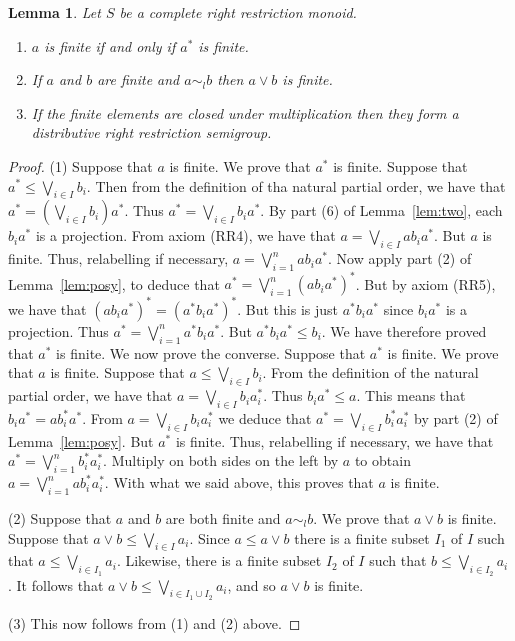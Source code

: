 \documentclass[a4paper]{amsart}
\newtheorem{lemma}[theorem]{Lemma}
\begin{document}
\begin{lemma}\label{lem:klavin} Let $S$ be a complete right restriction monoid.
\begin{enumerate}
\item $a$ is finite if and only if $a^{\ast}$ is finite.
\item If $a$ and $b$ are finite and $a \sim_{l} b$ then $a \vee b$ is finite.
\item If the finite elements are closed under multiplication then they form a distributive right restriction semigroup.
\end{enumerate}
\end{lemma}
\begin{proof} (1) Suppose that $a$ is finite.
We prove that $a^{\ast}$ is finite.
Suppose that $a^{\ast} \leq \bigvee_{i \in I} b_{i}$.
Then from the definition of tha natural partial order, we have that
$a^{\ast} = \left( \bigvee_{i \in I} b_{i} \right)a^{\ast}$.
Thus $a^{\ast} = \bigvee_{i \in I} b_{i}a^{\ast}$.
By part (6) of Lemma~\ref{lem:two}, each $b_{i}a^{\ast}$ is a projection.
From axiom (RR4), we have that 
$a = \bigvee_{i \in I} ab_{i}a^{\ast}$.
But $a$ is finite.
Thus, relabelling if necessary,
$a = \bigvee_{i = 1}^{n} ab_{i}a^{\ast}$.
Now apply part (2) of Lemma~\ref{lem:posy}, to deduce that
$a^{\ast} = \bigvee_{i = 1}^{n} (ab_{i}a^{\ast})^{\ast}$.
But by axiom (RR5), we have that $(ab_{i}a^{\ast})^{\ast} = (a^{\ast}b_{i}a^{\ast})^{\ast}$.
But this is just $a^{\ast}b_{i}a^{\ast}$ since $b_{i}a^{\ast}$ is a projection.
Thus
$a^{\ast} = \bigvee_{i = 1}^{n} a^{\ast}b_{i}a^{\ast}$.
But $a^{\ast}b_{i}a^{\ast} \leq b_{i}$.
We have therefore proved that $a^{\ast}$ is finite.
We now prove the converse.
Suppose that $a^{\ast}$ is finite.
We prove that $a$ is finite.
Suppose that $a \leq \bigvee_{i \in I} b_{i}$.
From the definition of the natural partial order,
we have that $a = \bigvee_{i \in I} b_{i}a_{i}^{\ast}$.
Thus $b_{i}a^{\ast} \leq a$.
This means that $b_{i}a^{\ast} = ab_{i}^{\ast}a^{\ast}$.
From $a = \bigvee_{i \in I} b_{i}a_{i}^{\ast}$
we deduce that 
$a^{\ast} = \bigvee_{i \in I} b_{i}^{\ast}a_{i}^{\ast}$
by part (2) of Lemma~\ref{lem:posy}.
But $a^{\ast}$ is finite.
Thus, relabelling if necessary, we have that 
$a^{\ast} = \bigvee_{i = 1}^{n} b_{i}^{\ast}a_{i}^{\ast}$.
Multiply on both sides on the left by $a$ to obtain
$a = \bigvee_{i = 1}^{n} ab_{i}^{\ast}a_{i}^{\ast}$.
With what we said above, this proves that $a$ is finite.

(2) Suppose that $a$ and $b$ are both finite and $a \sim_{l} b$.
We prove that $a \vee b$ is finite.
Suppose that $a \vee b \leq \bigvee_{i \in I} a_{i}$.
Since $a \leq a \vee b$ there is a finite subset $I_{1}$ of $I$ such that $a \leq \bigvee_{i \in I_{1}} a_{i}$.
Likewise, there is a finite subset $I_{2}$ of $I$ such that $b \leq \bigvee_{i \in I_{2}} a_{i}$.
It follows that $a \vee b \leq \bigvee_{i \in I_{1} \cup I_{2}} a_{i}$,
and so $a \vee b$ is finite.

(3) This now follows from (1) and (2) above. 
\end{proof}
\end{document}
